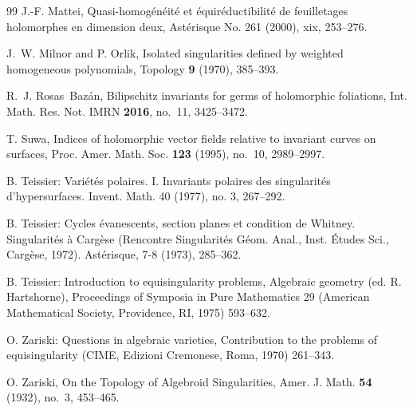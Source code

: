 \documentclass[12pt,letterpaper]{amsart}
\begin{document}
\begin{thebibliography}{99}
J.-F. Mattei, Quasi-homog\'en\'eit\'e{} et \'equir\'eductibilit\'e{} de feuilletages holomorphes en dimension deux, Ast\'erisque No. 261 (2000), xix, 253--276.

J.~W. Milnor and P. Orlik, Isolated singularities defined by weighted homogeneous polynomials, Topology {\bf 9} (1970), 385--393.

R.~J. Rosas~Baz\'an, Bilipschitz invariants for germs of holomorphic foliations, Int. Math. Res. Not. IMRN {\bf 2016}, no.~11, 3425--3472.


T. Suwa, Indices of holomorphic vector fields relative to invariant curves on surfaces, Proc. Amer. Math. Soc. {\bf 123} (1995), no.~10, 2989--2997.

B. Teissier: Vari\'et\'es polaires. I. Invariants polaires des singularit\'es d'hypersurfaces. Invent. Math. 40 (1977), no. 3, 267--292.

B. Teissier: Cycles \'evanescents, section planes et condition de Whitney.  Singularit\'es \`a Carg\`ese (Rencontre Singularit\'es G\'eom. Anal., Inst. \'Etudes Sci., Carg\`ese, 1972). Ast\'erisque, 7-8 (1973), 285--362.

B. Teissier: Introduction to equisingularity problems, Algebraic geometry (ed. R. Hartshorne),
Proceedings of Symposia in Pure Mathematics 29 (American Mathematical Society,
Providence, RI, 1975) 593--632.










O. Zariski: Questions in algebraic varieties, Contribution to the problems of equisingularity
(CIME, Edizioni Cremonese, Roma, 1970) 261--343.


O. Zariski, On the Topology of Algebroid Singularities, Amer. J. Math. {\bf 54} (1932), no.~3, 453--465.




\end{thebibliography}
\end{document}

